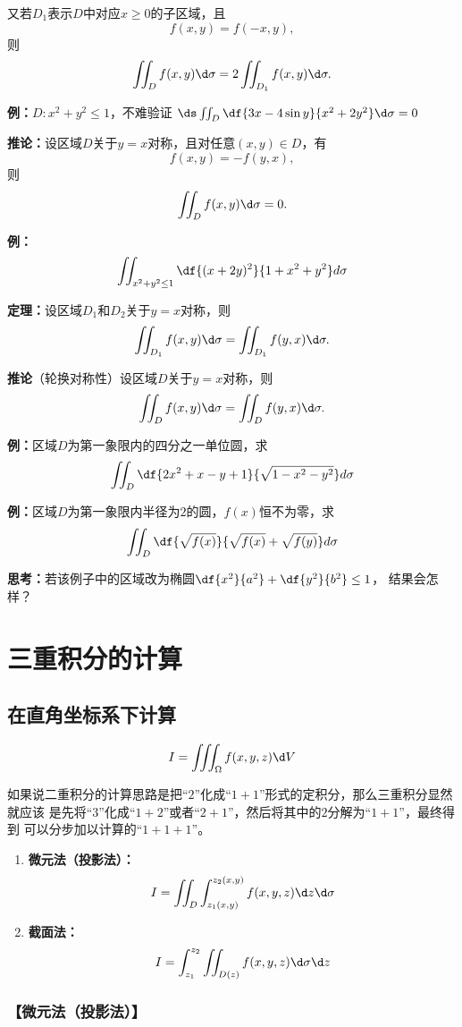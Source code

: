 又若$D_1$表示$D$中对应$x\geq0$的子区域，且
$$f(x,y)=f(-x,y),$$
则
$$\iint_Df(x,y)\d\sigma=2\iint_{D_1}f(x,y)\d\sigma.$$

{\bf 例：}$D:x^2+y^2\leq 1$，不难验证
$\ds\iint_D\df{3x-4\sin y}{x^2+2y^2}\d\sigma=0$

{\bf 推论：}设区域$D$关于$y=x$对称，且对任意$(x,y)\in D$，有
$$f(x,y)=-f(y,x),$$
则
$$\iint_Df(x,y)\d\sigma=0.$$

{\bf 例：}$$\iint_{x^2+y^2\leq 1}\df{(x+2y)^2}{1+x^2+y^2}d\sigma$$

{\bf 定理：}设区域$D_1$和$D_2$关于$y=x$对称，则
$$\iint_{D_1}f(x,y)\d\sigma=\iint_{D_1}f(y,x)\d\sigma.$$

{\bf 推论}（轮换对称性）设区域$D$关于$y=x$对称，则
$$\iint_Df(x,y)\d\sigma=\iint_Df(y,x)\d\sigma.$$

{\bf 例：}区域$D$为第一象限内的四分之一单位圆，求
$$\iint_D\df{2x^2+x-y+1}{\sqrt{1-x^2-y^2}}d\sigma$$


{\bf 例：}区域$D$为第一象限内半径为$2$的圆，$f(x)$恒不为零，求
$$\iint_D\df{\sqrt{f(x)}}{\sqrt{f(x)}+\sqrt{f(y)}}d\sigma$$

{\bf 思考：}若该例子中的区域改为椭圆$\df{x^2}{a^2}+\df{y^2}{b^2}\leq 1$，
结果会怎样？

\section{三重积分的计算}

\subsection{在直角坐标系下计算}

$${I=\iiint_{\Omega}f(x,y,z)\d V}$$

如果说二重积分的计算思路是把“$2$”化成“$1+1$”形式的定积分，那么三重积分显然就应该
是先将“$3$”化成“$1+2$”或者“$2+1$”，然后将其中的$2$分解为“$1+1$”，最终得到
可以分步加以计算的“$1+1+1$”。

\begin{enumerate}
  \item {\bf 微元法（投影法）：}
  $$I=\iint_D\int_{z_1(x,y)}^{z_2(x,y)}f(x,y,z)\d z\d\sigma$$
  \item {\bf 截面法：}
  $$I=\int_{z_1}^{z_2}\iint_{D(z)}f(x,y,z)\d\sigma \d z$$
\end{enumerate}

\subsubsection{【微元法（投影法）】}

